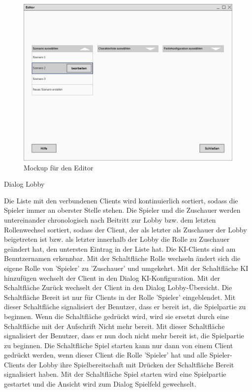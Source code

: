 \begin{figure}
  \centering
  \includegraphics[width=\textwidth]{Meilenstein03/Editor_Mockup.png}
  \caption{Mockup für den Editor}
\end{figure}

Dialog \glqq{}Lobby\grqq{}

Die Liste mit den verbundenen Clients wird kontinuierlich sortiert, sodass die Spieler immer an oberster Stelle stehen. Die Spieler und die Zuschauer werden untereinander chronologisch nach Beitritt zur Lobby bzw. dem letzten Rollenwechsel sortiert, sodass der Client, der als letzter als Zuschauer der Lobby beigetreten ist bzw. als letzter innerhalb der Lobby die Rolle zu Zuschauer geändert hat, den untersten Eintrag in der Liste hat. Die KI-Clients sind am Benutzernamen erkennbar. 
Mit der Schaltfläche \glqq{}Rolle wechseln\grqq{} ändert sich die eigene Rolle von 'Spieler' zu 'Zuschauer' und umgekehrt. 
Mit der Schaltfläche \glqq{}KI hinzufügen\grqq{} wechselt der Client in den Dialog \glqq{}KI-Konfiguration\grqq{}.
Mit der Schaltfläche \glqq{}Zurück\grqq{} wechselt der Client in den Dialog \glqq{}Lobby-Übersicht\grqq{}.
Die Schaltfläche \glqq{}Bereit\grqq{} ist nur für Clients in der Rolle 'Spieler' eingeblendet. Mit dieser Schaltfläche signalisiert der Benutzer, dass er bereit ist, die Spielpartie zu beginnen. Wenn die Schaltfläche gedrückt wird, wird sie ersetzt durch eine Schaltfläche mit der Aufschrift \glqq{}Nicht mehr bereit\grqq{}. Mit dieser Schaltfläche signalisiert der Benutzer, dass er nun doch nicht mehr bereit ist, die Spielpartie zu beginnen. Die Schaltfläche \glqq{}Spiel starten\grqq{} kann nur dann von einem Client gedrückt werden, wenn dieser Client die Rolle 'Spieler' hat und alle Spieler-Clients der Lobby ihre Spielbereitschaft mit Drücken der Schaltfläche \glqq{}Bereit\grqq{} signalisiert haben.
Mit der Schaltfläche \glqq{}Spiel starten\grqq{} wird eine Spielpartie gestartet und die Ansicht wird zum Dialog \glqq{}Spielfeld\grqq{} gewechselt.

